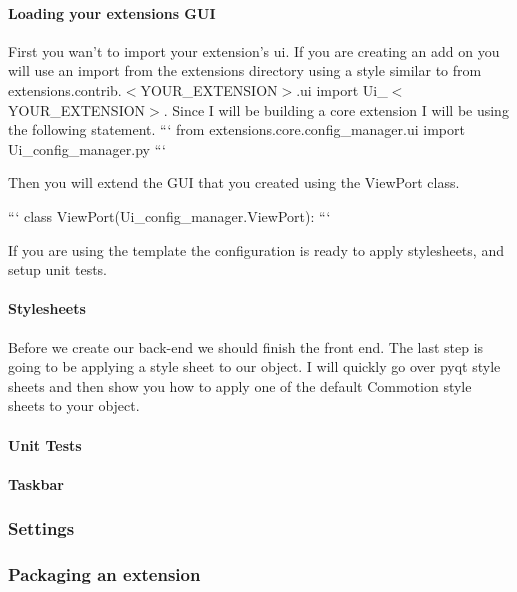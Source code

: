 \paragraph*{Loading your extensions G\-U\-I}

First you wan't to import your extension's ui. If you are creating an add on you will use an import from the extensions directory using a style similar to {\ttfamily from extensions.\-contrib.$<$Y\-O\-U\-R\-\_\-\-E\-X\-T\-E\-N\-S\-I\-O\-N$>$.ui import Ui\-\_\-$<$Y\-O\-U\-R\-\_\-\-E\-X\-T\-E\-N\-S\-I\-O\-N$>$}. Since I will be building a core extension I will be using the following statement. ``` from extensions.\-core.\-config\-\_\-manager.\-ui import Ui\-\_\-config\-\_\-manager.\-py ```

Then you will extend the G\-U\-I that you created using the View\-Port class.

``` class View\-Port(Ui\-\_\-config\-\_\-manager.\-View\-Port)\-: ```

If you are using the template the configuration is ready to apply stylesheets, and setup unit tests.

\paragraph*{Stylesheets}

Before we create our back-\/end we should finish the front end. The last step is going to be applying a style sheet to our object. I will quickly go over pyqt style sheets and then show you how to apply one of the default Commotion style sheets to your object.

\paragraph*{Unit Tests}

\paragraph*{Taskbar}

\subsubsection*{Settings}

\subsubsection*{Packaging an extension}